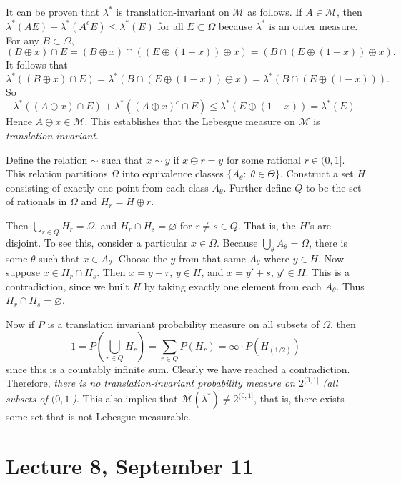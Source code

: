 \documentclass[11pt,fleqn]{book} %
\begin{document}
It can be proven that $\lambda^*$ is translation-invariant on $\mathcal{M}$ as follows. If $A \in \mathcal{M}$, then $\lambda^*(AE) + \lambda^*(A^cE) \leq \lambda^*(E)$ for all $E \subset \Omega$ because $\lambda^*$ is an outer measure. For any $B \subset \Omega$,
\[
	(B \oplus x) \cap E = (B \oplus x) \cap ((E \oplus (1-x)) \oplus x) = (B \cap (E \oplus (1-x)) \oplus x).
\]
It follows that
\[
	\lambda^*((B \oplus x) \cap E) = \lambda^*(B \cap (E \oplus (1-x)) \oplus x) = \lambda^*(B \cap (E \oplus (1-x))).
\]
So
\[
	\lambda^*((A \oplus x) \cap E) + \lambda^*((A \oplus x)^c \cap E) \leq \lambda^*(E \oplus (1-x)) = \lambda^*(E).
\]
Hence $A \oplus x \in \mathcal{M}$. This establishes that the Lebesgue measure on $\mathcal{M}$ is \emph{translation invariant}.

\vspace{10pt}
Define the relation $\sim$ such that $x \sim y$ if $x \oplus r = y$ for some rational $r \in (0,1]$. This relation partitions $\Omega$ into equivalence classes $\{A_\theta:\;\theta \in \Theta\}$. Construct a set $H$ consisting of exactly one point from each class $A_\theta$. Further define $Q$ to be the set of rationals in $\Omega$ and $H_r = H \oplus r$.

Then $\bigcup_{r \in Q} H_r = \Omega$, and $H_r \cap H_s = \varnothing$ for $r \neq s \in Q$. That is, the $H$'s are disjoint. To see this, consider a particular $x \in \Omega$. Because $\bigcup_\theta A_\theta = \Omega$, there is some $\theta$ such that $x \in A_\theta$. Choose the $y$ from that same $A_\theta$ where $y \in H$. Now suppose $x \in H_r \cap H_s$. Then $x = y+r$, $y \in H$, and $x = y'+s$, $y' \in H$. This is a contradiction, since we built $H$ by taking exactly one element from each $A_\theta$. Thus $H_r \cap H_s = \varnothing$.

Now if $P$ is a translation invariant probability measure on all subsets of $\Omega$, then
\[
	1 = P(\bigcup_{r \in Q} H_r) = \sum_{r \in Q} P(H_r) = \infty \cdot P(H_{(1/2)})
\]
since this is a countably infinite sum. Clearly we have reached a contradiction. Therefore, \emph{there is no translation-invariant probability measure on $2^{(0,1]}$ (all subsets of $(0,1]$)}. This also implies that $\mathcal{M}(\lambda^*) \neq 2^{(0,1]}$, that is, there exists some set that is not Lebesgue-measurable.

\section{Lecture 8, September 11}
\end{document}
